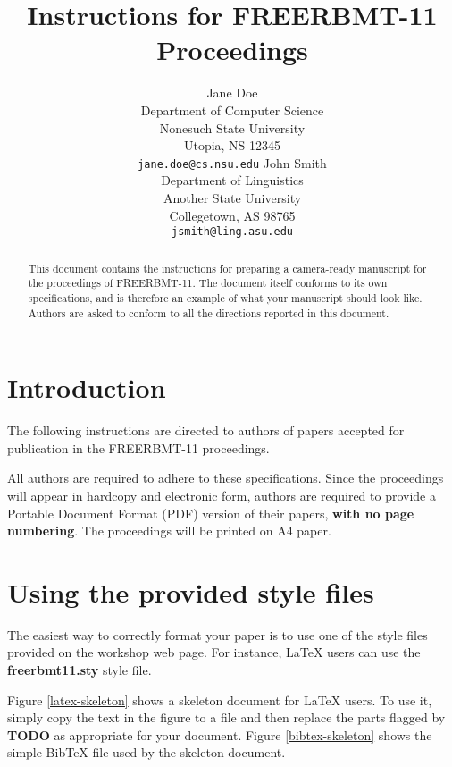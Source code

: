 \documentclass[11pt]{article}
\title{Instructions for FREERBMT-11 Proceedings}
\author{Jane Doe\\
  Department of Computer Science \\
  Nonesuch State University \\
  Utopia, NS 12345 \\
  {\tt jane.doe@cs.nsu.edu} \And
  John Smith \\
  Department of Linguistics \\
  Another State University \\
  Collegetown, AS 98765 \\  
  {\tt jsmith@ling.asu.edu}}
\date{}
\begin{document}
\maketitle

\begin{abstract}
  This document contains the instructions for preparing a camera-ready
  manuscript for the proceedings of FREERBMT-11.  The document itself
  conforms to its own specifications, and is therefore an example of
  what your manuscript should look like.  Authors are asked to conform
  to all the directions reported in this document.
\end{abstract}

\section{Introduction}

The following instructions are directed to authors of papers accepted
for publication in the FREERBMT-11 proceedings.

All authors are required to adhere to these specifications. Since the
proceedings will appear in hardcopy and electronic form, authors are
required to provide a Portable Document Format (PDF) version of their
papers, {\bf with no page numbering}. The proceedings will be printed
on A4 paper.

\section{Using the provided style files}

The easiest way to correctly format your paper is to use one of the
style files provided on the workshop web page. For instance, \LaTeX{}
users can use the {\bf freerbmt11.sty} style file.

Figure \ref{latex-skeleton} shows a skeleton document for \LaTeX{}
users.  To use it, simply copy the text in the figure to a file and
then replace the parts flagged by {\bf TODO} as appropriate for your
document.  Figure \ref{bibtex-skeleton} shows the simple Bib\TeX{}
file used by the skeleton document.

\end{document}
